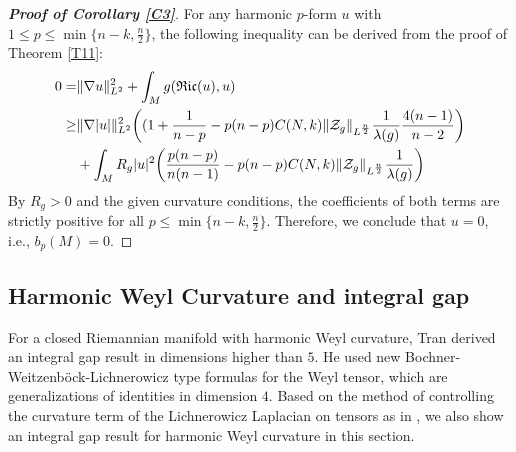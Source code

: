 \documentclass[12pt, twoside]{article}
\theoremstyle{definition}
\numberwithin{equation}{section}
\def \la {\lambda}
\def\na {\nabla}
\begin{document}
\begin{proof}[\textbf{Proof of Corollary \ref{C3}}]
For any harmonic $p$-form $u$ with $1\leq p\leq \min\{n-k,\frac{n}{2}\} $, the following inequality can be derived from the proof of Theorem \ref{T11}: 
	\begin{equation*}
	\begin{split}
	0=&\|\na u\|^{2}_{L^{2}}+\int_{M}g(\mathfrak{Ric}(u),u)\\	
	\geq &\|\na |u|\|^{2}_{L^{2}}\bigg{(}(1+\frac{1}{n-p}-p(n-p)C(N,k)\|\mathcal{Z}_{g}\|_{L^{ \frac{n}{2} }}\frac{1}{\la(g)}\frac{4(n-1)}{n-2}\bigg{)}\\
	&+\int_{M}R_{g}|u|^{2}\bigg{(}\frac{p(n-p)}{n(n-1)}-p(n-p)C(N,k)\|\mathcal{Z}_{g}\|_{L^{ \frac{n}{2} }}\frac{1}{\la(g)} \bigg{)}\\
	\end{split}
	\end{equation*}	
By $R_{g}>0$ and the given curvature conditions, the coefficients of both terms are strictly positive for all $p\leq \min\{n-k,\frac{n}{2}\}$. Therefore, we conclude that $u=0$, i.e., $b_{p}(M)=0$. 
\end{proof}
\subsection{Harmonic Weyl Curvature and integral gap}
For a closed Riemannian manifold with harmonic Weyl curvature, Tran \cite{Tra17} derived an integral gap result in dimensions higher than $5$. He used new Bochner-Weitzenb\"{o}ck-Lichnerowicz type formulas for the Weyl tensor, which are generalizations of identities in dimension $4$. Based on the  method of controlling the curvature term of the Lichnerowicz Laplacian on tensors as in \cite{PW21a,PW21b,PW22}, we also  show an integral gap result for harmonic Weyl curvature in this section.
\end{document}
